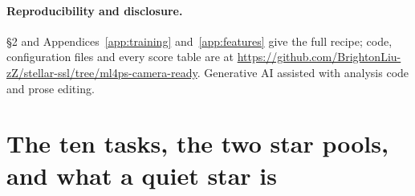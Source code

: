 \documentclass{article}
\begin{document}
\paragraph{Reproducibility and disclosure.} \S2 and Appendices~\ref{app:training}
and~\ref{app:features} give the full recipe; code, configuration files and every score table are at
\url{https://github.com/BrightonLiu-zZ/stellar-ssl/tree/ml4ps-camera-ready}. Generative AI assisted with
analysis code and prose editing.

\raggedbottom



\appendix

\section{The ten tasks, the two star pools, and what a quiet star is}
\label{app:pools}
\end{document}
